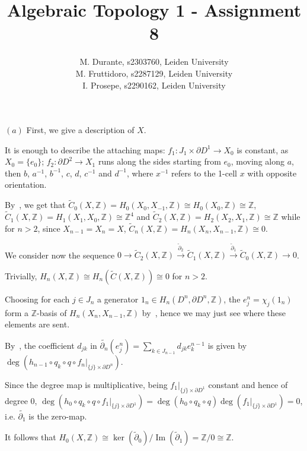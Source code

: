 \documentclass{article}
\newcommand{\numberset}{\mathbb}
\newcommand{\Z}{\numberset{Z}}
\newcommand{\I}{\mathbb{I}}
\DeclareMathOperator{\Ima}{Im}
\newcommand{\exercise}[1]{\noindent {\bf Exercise #1}}
\begin{document}
\title{Algebraic Topology 1 - Assignment 8}

\author{M. Durante, s2303760, Leiden University\\M. Fruttidoro, s2287129, Leiden University\\I. Prosepe, s2290162, Leiden University}

\maketitle


\exercise{1}

$(a)$ First, we give a description of $X$.

It is enough to describe the attaching maps: $f_1:J_1\times\partial D^1\rightarrow X_0$ is constant, as $X_0=\{e_0\}$; $f_2:\partial D^2\rightarrow X_1$ runs along the sides starting from $e_0$, moving along $a$, then $b$, $a^{-1}$, $b^{-1}$, $c$, $d$, $c^{-1}$ and $d^{-1}$, where $x^{-1}$ refers to the 1-cell $x$ with opposite orientation.

By~\cite[cor. 9.6]{sag}, we get that $\tilde{C}_0(X,\Z)=H_0(X_0,X_{-1},\Z)\cong H_0(X_0,\Z)\cong\Z$, $\tilde{C}_1(X,\Z)=H_1(X_1,X_0,\Z)\cong\Z^4$ and $\tilde{C}_2(X,\Z)=H_2(X_2,X_1,\Z)\cong\Z$ while for $n>2$, since $X_{n-1}=X_n=X$, $\tilde{C}_n(X,\Z)=H_n(X_n,X_{n-1},\Z)\cong 0$.

We consider now the sequence $0\rightarrow\tilde{C}_2(X,\Z)\xrightarrow{\tilde{\partial}_2}\tilde{C}_1(X,\Z)\xrightarrow{\tilde{\partial}_1}\tilde{C}_0(X,\Z)\rightarrow 0$.

Trivially, $H_n(X,\Z)\cong H_n(\tilde{C}(X,\Z))\cong 0$ for $n>2$.

Choosing for each $j\in J_n$ a generator $1_n\in H_n(D^n,\partial D^n,\Z)$, the $e^n_j=\chi_j(1_n)$ form a $\Z$-basis of $H_n(X_n,X_{n-1},\Z)$ by~\cite[cor. 10.1]{sag}, hence we may just see where these elements are sent.

By~\cite[thm. 10.4]{sag}, the coefficient $d_{jk}$ in $\tilde{\partial_n}(e^n_j)=\sum_{k\in J_{n-1}} d_{jk}e^{n-1}_k$ is given by $\deg(h_{n-1}\circ q_k\circ q\circ f_n|_{\{j\}\times\partial D^n})$.

Since the degree map is multiplicative, being $f_1|_{\{j\}\times\partial D^1}$ constant and hence of degree 0, $\deg(h_0\circ q_k\circ q\circ f_1|_{\{j\}\times\partial D^1})=\deg(h_0\circ q_k\circ q)\deg(f_1|_{\{j\}\times\partial D^1})=0$, i.e. $\tilde{\partial_1}$ is the zero-map.

It follows that $H_0(X,\Z)\cong\ker(\tilde{\partial}_0)/\Ima(\tilde{\partial}_1)=\Z/0\cong\Z$.
\end{document}
